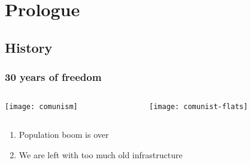 \section{Prologue}
\subsection{History}

\begin{frame}
	\frametitle{30 years of freedom}
	\pause
	\begin{columns}
		\begin{column}{0.45\textwidth}
			\texttt{[image: comunism]}
		\end{column}
		\begin{column}{0.45\textwidth}
			\texttt{[image: comunist-flats]}
		\end{column}
	\end{columns}
	\vspace{1em}

	\begin{enumerate}
		\item Population boom is over
		\item We are left with too much old infrastructure
	\end{enumerate}
\end{frame}
